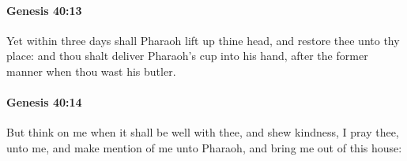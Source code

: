 		\paragraph{Genesis 40:13} %
			\label{GENESIS-40-13}

			Yet within three days shall Pharaoh lift up thine head, and restore thee unto thy place: and thou shalt deliver Pharaoh's cup into his hand, after the former manner when thou wast his butler.


		\paragraph{Genesis 40:14} %
			\label{GENESIS-40-14}

			But think on me when it shall be well with thee, and shew kindness, I pray thee, unto me, and make mention of me unto Pharaoh, and bring me out of this house:


